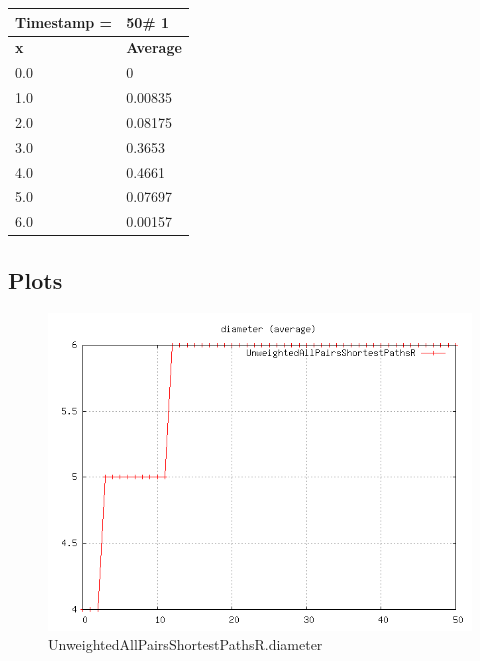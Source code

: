 \begin{tabular}{|l||l|}
\hline
\textbf{Timestamp =} & \textbf{50}\# 1\\\hline
	\textbf{x} & \textbf{Average} \\ \hline
\hline
	0.0 & 0 \\ \hline
	1.0 & 0.00835 \\ \hline
	2.0 & 0.08175 \\ \hline
	3.0 & 0.3653 \\ \hline
	4.0 & 0.4661 \\ \hline
	5.0 & 0.07697 \\ \hline
	6.0 & 0.00157 \\ \hline
\end{tabular}

\subsection{Plots}

\begin{figure} [h]
	\centering
	\includegraphics [scale=0.8] {plots/UnweightedAllPairsShortestPathsR.diameter}
	\caption{UnweightedAllPairsShortestPathsR.diameter}
	\label{plot:RANDOM_100_500 - BARABASI_ALBERT_GROWTH_10_2.UnweightedAllPairsShortestPathsR.diameter}
\end{figure}

